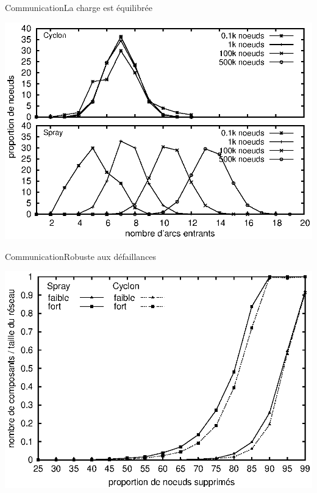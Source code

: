 \begin{frame}{Communication}{La charge est équilibrée}
  \begin{center}
    \includegraphics[width=1\textwidth]{img/network/histo.eps}
  \end{center}
\end{frame}

\begin{frame}{Communication}{Robuste aux défaillances}
  \begin{center}
    \includegraphics[width=1\textwidth]{img/network/resilience.eps}
  \end{center}
\end{frame}
